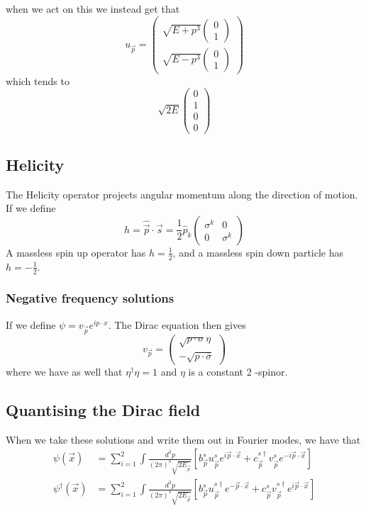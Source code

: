 when we act on this we instead get that 
\[
	u _{ \vec{p} }  = \begin{pmatrix}  \sqrt{ E + p^ 3 }  \begin{pmatrix}  0 \\ 1   \end{pmatrix}  \\
 \sqrt{ E - p ^ 3 }  \begin{pmatrix}  0 \\ 1  \end{pmatrix}  \end{pmatrix} 
\] which tends to 
\[
 \sqrt{2 E }  \begin{pmatrix}  0 \\ 1 \\ 0 \\ 0  \end{pmatrix} 
\]
\subsection{Helicity}

The Helicity operator projects angular momentum 
along the direction of motion. 
If we define 
\[
	h = \hat{\vec{p} } \cdot  \vec{s}  = \frac{1}{2 } \hat{ p } _ k 
	\begin{pmatrix}  \sigma ^ k & 0 \\ 0 & \sigma ^ k  \end{pmatrix} 
\] A massless spin up operator has $ h = \frac{1}{2 } $, and a massless spin down 
particle has $ h = - \frac{1}{2 } $. 

\subsubsection{Negative frequency solutions} 
If we define $ \psi  = v _{ \vec{p} } e ^{ i p \cdot  x } $. 
The Dirac equation then gives 
\[
 v_{ \vec{p} }  = \begin{pmatrix}  \sqrt{ p \cdot  \sigma }  \eta \\
  - \sqrt{ p \cdot  \overline{ \sigma }  }  \end{pmatrix} 
\] where we have as well that $ \eta ^ \dagger \eta  = 1 $ and $ \eta $ 
is a constant 2 -spinor. 


\subsection{Quantising the Dirac field} 
When we take these solutions and write them out 
in Fourier modes, we have that 
\begin{align*}
	\psi ( \vec{x} ) &=  \sum _{ i = 1 } ^ 2 
	\int \frac{ d^ 3 p }{ ( 2 \pi ) ^ 3 \sqrt{ 2 E_{ \vec{p} } }  } \left[  
	b_{ \vec{p} } ^ s u _{ \vec{p} } ^ s e ^{ i \vec{p} \cdot  \vec{x} } 
+ c_{ \vec{p} } ^{ s \dagger } v_{ \vec{p} } ^ s e ^{ - i \vec{p} \cdot  \vec{x}}\right] \\
\psi ^ \dagger ( \vec{x} ) &=  \sum _{ i = 1 } ^ 2 
\int \frac{ d ^ 3 p }{ ( 2 \pi ) ^ 3 \sqrt{ 2 E _{ \vec{p} } }  } \left[  
b_{ \vec{p} } ^ s u_{\vec{p} } ^{ s \dagger } e ^{ - \vec{p} \cdot  \vec{x} } + 
c_{ \vec{p} } ^ s v_{ \vec{p}} ^{ s \dagger } e ^{ i \vec{p} \cdot  \vec{x} } \right] \\ 
\end{align*}

